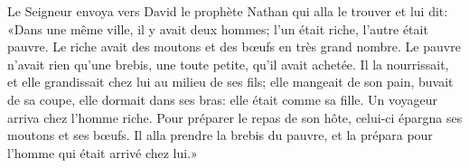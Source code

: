 Le Seigneur envoya vers David le prophète Nathan qui alla le trouver et lui dit:
	«Dans une même ville, il y avait deux hommes;
	l’un était riche, l’autre était pauvre.
Le riche avait des moutons et des bœufs en très grand nombre.
	Le pauvre n’avait rien qu’une brebis, une toute petite, qu’il avait achetée.
Il la nourrissait, et elle grandissait chez lui au milieu de ses fils;
	elle mangeait de son pain, buvait de sa coupe, elle dormait dans ses bras:
	elle était comme sa fille.
Un voyageur arriva chez l’homme riche.
Pour préparer le repas de son hôte, celui-ci épargna ses moutons et ses bœufs.
	Il alla prendre la brebis du pauvre,
	et la prépara pour l’homme qui était arrivé chez lui.»
